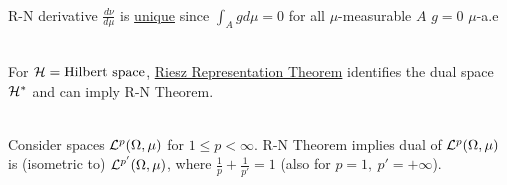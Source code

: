 \begin{remark}\ \\
R-N derivative $\frac{d\nu}{d\mu}$ is \underline{unique} since $\int_A g d\mu = 0$ for all $\mu$-measurable $A$ \imply $g = 0$ $\mu$-a.e
\end{remark}

\begin{remark}\ \\
For $\mathcal{H} = \text{Hilbert space}$, \hyperref[RRT]{Riesz Representation Theorem} identifies the dual space $\mathcal{H}^*$ and can imply R-N Theorem.
\end{remark}

\vspace{3pt}
\begin{corollary}\ \\   
Consider spaces $\mathcal{L}^p(\Omega, \mu)$ for
$1 \leq p < \infty$. R-N Theorem implies dual of $\mathcal{L}^p(\Omega, \mu)$ is (isometric to) $\mathcal{L}^{p'}(\Omega, \mu)$, where $\frac{1}{p} + \frac{1}{p'} = 1$ (also for $p=1,\ p' = +\infty$).
\end{corollary}
